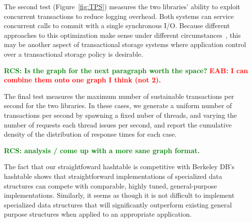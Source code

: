 \documentclass[letterpaper,twocolumn,english]{article}
\newcommand{\yad}{Lemon\xspace}
\newcommand{\eab}[1]{\textcolor{red}{\bf EAB: #1}}
\newcommand{\rcs}[1]{\textcolor{green}{\bf RCS: #1}}
\begin{document}


The second test (Figure~\ref{fig:TPS}) measures the two libraries' ability to exploit
concurrent transactions to reduce logging overhead.  Both systems
can service concurrent calls to commit with a single 
synchronous I/O. Because different approaches to this 
optimization make sense under different circumstances~\cite{findWorkOnThisOrRemoveTheSentence}, this may 
be another aspect of transactional storage systems where
application control over a transactional storage policy is desirable.  


\rcs{Is the graph for the next paragraph worth the space?}
\eab{I can combine them onto one graph I think (not 2).}

The final test measures the maximum number of sustainable transactions
per second for the two libraries.  In these cases, we generate a
uniform number of transactions per second by spawning a fixed nuber of
threads, and varying the number of requests each thread issues per
second, and report the cumulative density of the distribution of
response times for each case.

\rcs{analysis / come up with a more sane graph format.}

The fact that our straightfoward hashtable is competitive 
with Berkeley DB's hashtable shows that
straightforward implementations of specialized data structures can 
compete with comparable, highly tuned, general-purpose implementations.  
Similarly, it seems as though it is not difficult to implement specialized 
data structures that will significantly outperform existing 
general purpose structures when applied to an appropriate application.
\end{document}
